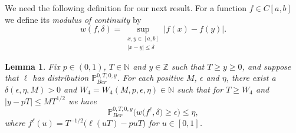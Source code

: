 \documentclass[12pt]{article}
\newtheorem{lemma}{Lemma}
\begin{document}
	We need the following definition for our next result. For a function $f \in C[a,b]$ we define its {\em modulus of continuity} by
	\begin{equation}\label{MOCS4}
	w(f,\delta) = \sup_{\substack{x,y \in [a,b]\\ |x-y| \leq \delta}} |f(x) - f(y)|.
	\end{equation}
	\begin{lemma}\label{MOCLemmaS4}Fix $p \in (0,1)$, $T \in \mathbb{N}$ and $y\in \mathbb{Z}$ such that $T \geq y \geq 0$, and suppose that $\ell$ has distribution $\mathbb{P}^{0,T,0,y}_{Ber}$. For each positive $M$, $\epsilon$ and $\eta$, there exist a $\delta(\epsilon, \eta, M) > 0$ and $W_4 = W_4(M, p, \epsilon, \eta) \in \mathbb{N}$ such that  for $T \geq W_4$ and $|y - pT| \leq MT^{1/2}$ we have
		\begin{equation}\label{MOCeqS4}
		\mathbb{P}^{0,T,0,y}_{Ber}\Big( w\big({f^\ell},\delta\big) \geq \epsilon \Big) \leq \eta,
		\end{equation}
		where $f^\ell(u) = T^{-1/2}\big(\ell(uT) - puT\big)$  for $u \in [0,1]$.
	\end{lemma}
	
\end{document}
